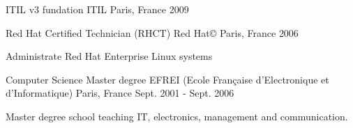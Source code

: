 \begin{cventries}
    \cventry
    {ITIL v3 fundation} %
    {ITIL} %
    {Paris, France} %
    {2009} %
    {}

    \cventry
    {Red Hat Certified Technician (RHCT)} %
    {Red Hat\copyright} %
    {Paris, France} %
    {2006} %
    {
        \begin{cvitems}
            \item {Administrate Red Hat Enterprise Linux systems}
        \end{cvitems}
    }
    
    \cventry
    {Computer Science Master degree} %
    {EFREI (Ecole Française d'Electronique et d'Informatique)} %
    {Paris, France} %
    {Sept. 2001 - Sept. 2006} %
    {
        \begin{cvitems}
            \item {Master degree school teaching IT, electronics, management and communication.}
        \end{cvitems}
    }
\end{cventries}